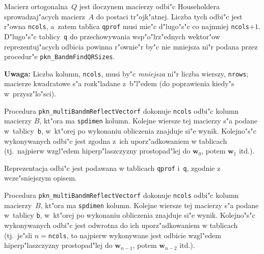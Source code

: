 Macierz ortogonalna~$Q$ jest iloczynem macierzy odbi"c Householdera
sprowadzaj"acych macierz~$A$ do postaci tr"ojk"atnej. Liczba tych odbi"c
jest r"owna \texttt{ncols}, a~zatem tablica \texttt{qprof} musi mie"c
d"lugo"s"c co najmniej \texttt{ncols}$+1$. D"lugo"s"c tablicy~\texttt{q} do
przechowywania wsp"o"lrz"ednych wektor"ow reprezentuj"acych odbicia
powinna r"ownie"r by"c nie mniejsza ni"r podana przez procedur"e
\texttt{pkn\_BandmFindQRSizes}.

\vspace{\medskipamount}
\noindent
\textbf{Uwaga:} Liczba kolumn, \texttt{ncols}, musi by"c \emph{mniejsza}
ni"r liczba wierszy, \texttt{nrows}; macierze kwadratowe s"a rozk"ladane
z~b"l"edem (do poprawienia kiedy"s w~przysz"lo"sci).

\vspace{\bigskipamount}
Procedura \texttt{pkn\_multiBandmReflectVectorf} dokonuje \texttt{ncols}
odbi"c kolumn macierzy $B$, kt"ora ma \texttt{spdimen} kolumn. Kolejne
wiersze tej macierzy s"a podane w~tab\-li\-cy~\texttt{b}, w~kt"orej po
wykonaniu
obliczenia znajduje si"e wynik. Kolejno"s"c wykonywanych odbi"c jest zgodna
z~ich uporz"adkowaniem w tablicach (tj.\ najpierw wzgl"edem
hiperp"laszczyzny prostopad"lej do $\bm{w}_0$, potem $\bm{w}_1$ itd.).

Reprezentacja odbi"c jest podawana w tablicach \texttt{qprof} i~\texttt{q},
zgodnie z wcze"sniejszym opisem.

\newpage
Procedura \texttt{pkn\_multiBandmReflectVectorf} dokonuje \texttt{ncols}
odbi"c kolumn macierzy~$B$, kt"ora ma \texttt{spdimen} kolumn. Kolejne
wiersze tej macierzy s"a podane w~tablicy \texttt{b}, w~kt"orej po wykonaniu
obliczenia znajduje si"e wynik. Kolejno"s"c wykonywanych odbi"c jest
odwrotna do ich uporz"adkowaniem w tablicach (tj.\ je"sli
$n=$\texttt{ncols}, to najpierw wykonywane jest odbicie wzgl"edem
hiperp"laszczyzny prostopad"lej do $\bm{w}_{n-1}$, potem $\bm{w}_{n-2}$ itd.).


